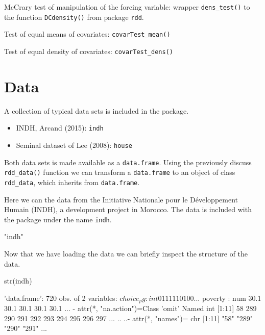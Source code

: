 \documentclass[article]{jss}
\begin{document}
McCrary test of manipulation of the forcing variable: wrapper
\texttt{dens\_test()} to the function \texttt{DCdensity()} from package
\texttt{rdd}.

Test of equal means of covariates: \texttt{covarTest\_mean()}

Test of equal density of covariates: \texttt{covarTest\_dens()}

\section{Data}\label{data}

A collection of typical data sets is included in the package.

\begin{itemize}
\itemsep1pt\parskip0pt
\item
  INDH, Arcand (2015): \texttt{indh}
\item
  Seminal dataset of Lee (2008): \texttt{house}
\end{itemize}

Both data sets is made available as a \texttt{data.frame}. Using the
previously discuss \texttt{rdd\_data()} function we can transform a
\texttt{data.frame} to an object of class \texttt{rdd\_data}, which
inherits from \texttt{data.frame}.

Here we can the data from the Initiative Nationale pour le Développement
Humain (INDH), a development project in Morocco. The data is included
with the package under the name \texttt{indh}.

\begin{CodeChunk}
\begin{CodeOutput}
[1] "indh"
\end{CodeOutput}
\end{CodeChunk}

Now that we have loading the data we can briefly inspect the structure
of the data.

\begin{CodeChunk}
\begin{CodeInput}
str(indh)
\end{CodeInput}
\begin{CodeOutput}
'data.frame':   720 obs. of  2 variables:
 $ choice_pg: int  0 1 1 1 1 1 0 1 0 0 ...
 $ poverty  : num  30.1 30.1 30.1 30.1 30.1 ...
 - attr(*, "na.action")=Class 'omit'  Named int [1:11] 58 289 290 291 292 293 294 295 296 297 ...
  .. ..- attr(*, "names")= chr [1:11] "58" "289" "290" "291" ...
\end{CodeOutput}
\end{CodeChunk}
\end{document}
